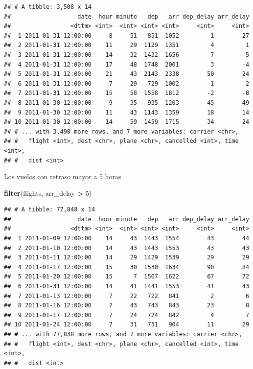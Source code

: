 \documentclass[]{article}
\newenvironment{Shaded}{\begin{snugshade}}{\end{snugshade}}
\newcommand{\KeywordTok}[1]{\textcolor[rgb]{0.13,0.29,0.53}{\textbf{#1}}}
\newcommand{\DecValTok}[1]{\textcolor[rgb]{0.00,0.00,0.81}{#1}}
\newcommand{\StringTok}[1]{\textcolor[rgb]{0.31,0.60,0.02}{#1}}
\newcommand{\OperatorTok}[1]{\textcolor[rgb]{0.81,0.36,0.00}{\textbf{#1}}}
\newcommand{\NormalTok}[1]{#1}
\begin{document}
\begin{verbatim}
## # A tibble: 3,508 x 14
##                   date  hour minute   dep   arr dep_delay arr_delay
##                 <dttm> <int>  <int> <int> <int>     <int>     <int>
##  1 2011-01-31 12:00:00     8     51   851  1052         1       -27
##  2 2011-01-31 12:00:00    11     29  1129  1351         4         1
##  3 2011-01-31 12:00:00    14     32  1432  1656         7         5
##  4 2011-01-31 12:00:00    17     48  1748  2001         3        -4
##  5 2011-01-31 12:00:00    21     43  2143  2338        50        24
##  6 2011-01-31 12:00:00     7     29   729  1002        -1         2
##  7 2011-01-31 12:00:00    15     58  1558  1812        -2        -8
##  8 2011-01-30 12:00:00     9     35   935  1203        45        49
##  9 2011-01-30 12:00:00    11     43  1143  1359        18        14
## 10 2011-01-30 12:00:00    14     59  1459  1715        34        24
## # ... with 3,498 more rows, and 7 more variables: carrier <chr>,
## #   flight <int>, dest <chr>, plane <chr>, cancelled <int>, time <int>,
## #   dist <int>
\end{verbatim}

Los vuelos con retraso mayor a 5 horas

\begin{Shaded}
\begin{Highlighting}[]
\KeywordTok{filter}\NormalTok{(flights, arr_delay }\OperatorTok{>}\StringTok{ }\DecValTok{5}\NormalTok{)}
\end{Highlighting}
\end{Shaded}

\begin{verbatim}
## # A tibble: 77,848 x 14
##                   date  hour minute   dep   arr dep_delay arr_delay
##                 <dttm> <int>  <int> <int> <int>     <int>     <int>
##  1 2011-01-09 12:00:00    14     43  1443  1554        43        44
##  2 2011-01-10 12:00:00    14     43  1443  1553        43        43
##  3 2011-01-11 12:00:00    14     29  1429  1539        29        29
##  4 2011-01-17 12:00:00    15     30  1530  1634        90        84
##  5 2011-01-20 12:00:00    15      7  1507  1622        67        72
##  6 2011-01-31 12:00:00    14     41  1441  1553        41        43
##  7 2011-01-13 12:00:00     7     22   722   841         2         6
##  8 2011-01-16 12:00:00     7     43   743   843        23         8
##  9 2011-01-17 12:00:00     7     24   724   842         4         7
## 10 2011-01-24 12:00:00     7     31   731   904        11        29
## # ... with 77,838 more rows, and 7 more variables: carrier <chr>,
## #   flight <int>, dest <chr>, plane <chr>, cancelled <int>, time <int>,
## #   dist <int>
\end{verbatim}
\end{document}

